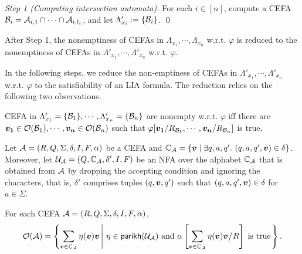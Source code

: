 \medskip
\noindent
\emph{Step 1 (Computing intersection automata).} For each $i \in [n]$, compute a CEFA $\mathcal{B}_{i} = \mathcal{A}_{i,1} \cap \cdots \cap \mathcal{A}_{i, l_i}$, and let $\Lambda'_{x_i} := \{\mathcal{B}_i\}$. \qed

After Step 1, the nonemptiness of CEFAs in $\Lambda_{x_1}, \cdots, \Lambda_{x_n}$ w.r.t. $\varphi$ is reduced to the nonemptiness of CEFAs in $\Lambda'_{x_1}, \cdots, \Lambda'_{x_n}$ w.r.t. $\varphi$. 

In the following steps, we reduce the non-emptiness of CEFAs in $\Lambda'_{x_1}, \cdots, \Lambda'_{x_n}$ w.r.t. $\varphi$ to the satisfiability of an LIA formula. The reduction relies on the following two observations. 

\begin{observation}\label{obs-cefa-output}
CEFA in $\Lambda'_{x_1} = \{\mathcal{B}_1\}, \cdots, \Lambda'_{x_n} = \{\mathcal{B}_n\}$ are nonempty w.r.t. $\varphi$ iff there are $\myvec{v_{1}} \in \cefaout(\cB_1), \cdots, \myvec{v_{n}} \in \cefaout(\cB_n)$ such that $\varphi[\myvec{v_{1}}/R_{\cB_{1}}, \cdots, \myvec{v_{n}}/R_{\cB_{n}}]$ is true.
\end{observation}

Let $\mathcal{A} = (R, Q, \Sigma, \delta, I, F, \alpha)$ be a CEFA and $\costset_\aut = \{\myvec{v} \mid \exists q, a, q'.\ (q, a, q', \myvec{v}) \in \delta\}$. 
Moreover, let $\mathcal{U}_{\mathcal{A}} = (Q, \mathbb{C}_{\mathcal{A}}, \delta', I, F)$ be an NFA over the alphabet $\mathbb{C}_{\mathcal{A}}$ that is obtained from $\mathcal{A}$ by dropping the accepting condition and ignoring the characters, that is, $\delta'$ comprises tuples $(q, \myvec{v}, q')$ such that $(q, a, q', \myvec{v}) \in \delta$ for $a \in \Sigma$.
%

\begin{observation}\label{obs-cefa-nfa}
For each CEFA $\mathcal{A} = (R, Q, \Sigma, \delta, I, F, \alpha)$, 
%
$$\cefaout(\aut) = \left\{\sum \limits_{\myvec{v} \in \costset_\aut} \eta(\myvec{v}) \myvec{v} \left \vert\ \eta \in \parikh(\cU_\aut) \mbox{ and }  \alpha\left[  \sum \limits_{\myvec{v} \in \costset_\aut} \eta(\myvec{v}) \myvec{v} \big{/}  R \right] \mbox{ is true}\right.\right\}.$$
%
\end{observation}


